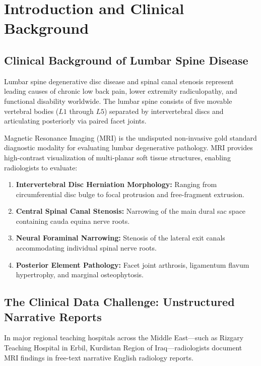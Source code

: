 \chapter{Introduction and Clinical Background}
\label{ch:introduction}

\section{Clinical Background of Lumbar Spine Disease}
Lumbar spine degenerative disc disease and spinal canal stenosis represent leading causes of chronic low back pain, lower extremity radiculopathy, and functional disability worldwide. The lumbar spine consists of five movable vertebral bodies ($L1$ through $L5$) separated by intervertebral discs and articulating posteriorly via paired facet joints.

Magnetic Resonance Imaging (MRI) is the undisputed non-invasive gold standard diagnostic modality for evaluating lumbar degenerative pathology. MRI provides high-contrast visualization of multi-planar soft tissue structures, enabling radiologists to evaluate:
\begin{enumerate}
    \item \textbf{Intervertebral Disc Herniation Morphology:} Ranging from circumferential disc bulge to focal protrusion and free-fragment extrusion.
    \item \textbf{Central Spinal Canal Stenosis:} Narrowing of the main dural sac space containing cauda equina nerve roots.
    \item \textbf{Neural Foraminal Narrowing:} Stenosis of the lateral exit canals accommodating individual spinal nerve roots.
    \item \textbf{Posterior Element Pathology:} Facet joint arthrosis, ligamentum flavum hypertrophy, and marginal osteophytosis.
\end{enumerate}

\section{The Clinical Data Challenge: Unstructured Narrative Reports}
In major regional teaching hospitals across the Middle East---such as Rizgary Teaching Hospital in Erbil, Kurdistan Region of Iraq---radiologists document MRI findings in free-text narrative English radiology reports.

